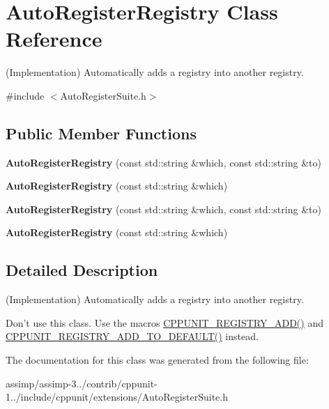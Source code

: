 \hypertarget{class_auto_register_registry}{\section{Auto\+Register\+Registry Class Reference}
\label{class_auto_register_registry}
}


(Implementation) Automatically adds a registry into another registry.  




{\ttfamily \#include $<$Auto\+Register\+Suite.\+h$>$}

\subsection*{Public Member Functions}
\begin{DoxyCompactItemize}
\item 
\hypertarget{class_auto_register_registry_aeb3c0171549420bc18714d4117d9c2b5}{{\bfseries Auto\+Register\+Registry} (const std\+::string \&which, const std\+::string \&to)}\label{class_auto_register_registry_aeb3c0171549420bc18714d4117d9c2b5}

\item 
\hypertarget{class_auto_register_registry_a3efb50c6218f5d0e5969eb6fc8bccb23}{{\bfseries Auto\+Register\+Registry} (const std\+::string \&which)}\label{class_auto_register_registry_a3efb50c6218f5d0e5969eb6fc8bccb23}

\item 
\hypertarget{class_auto_register_registry_aeb3c0171549420bc18714d4117d9c2b5}{{\bfseries Auto\+Register\+Registry} (const std\+::string \&which, const std\+::string \&to)}\label{class_auto_register_registry_aeb3c0171549420bc18714d4117d9c2b5}

\item 
\hypertarget{class_auto_register_registry_a3efb50c6218f5d0e5969eb6fc8bccb23}{{\bfseries Auto\+Register\+Registry} (const std\+::string \&which)}\label{class_auto_register_registry_a3efb50c6218f5d0e5969eb6fc8bccb23}

\end{DoxyCompactItemize}


\subsection{Detailed Description}
(Implementation) Automatically adds a registry into another registry. 

Don't use this class. Use the macros \hyperlink{group___creating_test_suite_ga0785e2e8a821f70c69a8127c35c0a667}{C\+P\+P\+U\+N\+I\+T\+\_\+\+R\+E\+G\+I\+S\+T\+R\+Y\+\_\+\+A\+D\+D()} and \hyperlink{group___creating_test_suite_ga9c3be3389213e1dc823ed580cc60878f}{C\+P\+P\+U\+N\+I\+T\+\_\+\+R\+E\+G\+I\+S\+T\+R\+Y\+\_\+\+A\+D\+D\+\_\+\+T\+O\+\_\+\+D\+E\+F\+A\+U\+L\+T()} instead. 

The documentation for this class was generated from the following file\+:\begin{DoxyCompactItemize}
\item 
assimp/assimp-\/3../contrib/cppunit-\/1../include/cppunit/extensions/Auto\+Register\+Suite.\+h\end{DoxyCompactItemize}
